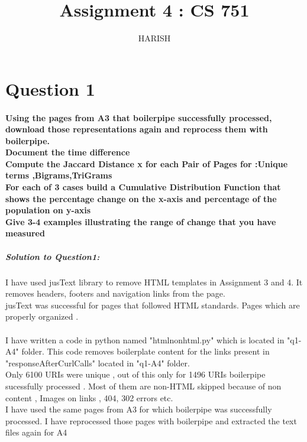 \documentclass[12pt]{Report}
\begin{document}
\title{Assignment 4 : CS 751 }
\author{HARISH}

\maketitle

\section{Question 1}

\paragraph{ Using the pages from A3 that boilerpipe successfully processed, download those representations again and reprocess them with boilerpipe.\\ Document the time difference \\
Compute the Jaccard Distance x for each Pair of Pages for :Unique terms ,Bigrams,TriGrams\\ For each of 3 cases build a Cumulative Distribution Function that shows the percentage change on the x-axis and percentage of the population on y-axis\\ Give 3-4 examples illustrating the range of change that you have measured}

 

\subparagraph{Solution to Question1: \\}

I have used jusText library to remove HTML templates in Assignment 3 and 4. It removes headers, footers and navigation links from the page.\\
jusText was successful for pages that followed HTML standards. Pages which are properly organized .\\
 \\
I have written a code in python named "htmlnonhtml.py" which is located in "q1-A4" folder. This code removes boilerplate content for the links present in "responseAfterCurlCalls" located in "q1-A4" folder. \\

Only 6100 URIs were unique , out of this only for 1496 URIs boilerpipe sucessfully processed . Most of them are non-HTML skipped because of non content , Images on links , 404, 302 errors etc. \\

I have used the same pages from A3 for which boilerpipe was successfully processed. I have reprocessed those pages with boilerpipe and extracted the text files again for A4  \\
\end{document}
